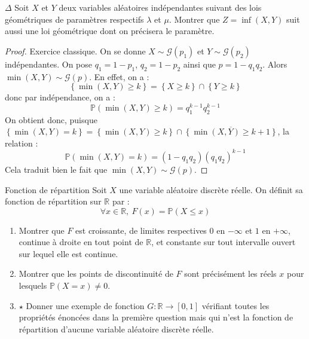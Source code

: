 \documentclass[french,a4paper]{article}
\renewcommand{\P}{\mathbb{P}}
\newcommand{\R}{\mathbb{R}}
\theoremstyle{plain}
\theoremstyle{definition}
\theoremstyle{remark}
\begin{document}
\begin{ex}{$\Delta$}
	Soit $X$ et $Y$ deux variables aléatoires indépendantes suivant des lois géométriques de paramètres respectifs $\lambda$ et $\mu$. Montrer que $Z=\inf(X,Y)$ suit aussi une loi géométrique dont on précisera le paramètre.
\end{ex}
\begin{proof}
	Exercice classique. On se donne $X\sim\mathcal{G}(p_1)$ et $Y\sim\mathcal{G}(p_2)$ indépendantes. On pose $q_1=1-p_1$, $q_2=1-p_2$ ainsi que $p=1-q_1q_2$. Alors $\min(X,Y)\sim\mathcal{G}(p)$. En effet, on a : $$\left\{\min(X,Y)\geqslant k\right\}=\left\{X\geqslant k\right\}\cap\left\{Y\geqslant k\right\}$$ donc par indépendance, on a : $$\P(\min(X,Y)\geqslant k)=q_1^{k-1}q_2^{k-1}$$ On obtient donc, puisque $\left\{\min(X,Y)=k\right\}=\left\{\min(X,Y)\geqslant k\right\}\cap\overline{\left\{\min(X,Y)\geqslant k+1\right\}}$, la relation : $$\P(\min(X,Y)=k)=(1-q_1q_2)(q_1q_2)^{k-1}$$ Cela traduit bien le fait que $\min(X,Y)\sim\mathcal{G}(p)$.
\end{proof}

\begin{ex}{Fonction de répartition}
	Soit $X$ une variable aléatoire discrète réelle. On définit sa fonction de répartition sur $\R$ par : $$\forall x\in\R,\ F(x)=\P(X\leqslant x)$$
	\begin{enumerate}
		\item Montrer que $F$ est croissante, de limites respectives $0$ en $-\infty$ et $1$ en $+\infty$, continue à droite en tout point de $\R$, et constante sur tout intervalle ouvert sur lequel elle est continue.
		\item Montrer que les points de discontinuité de $F$ sont précisément les réels $x$ pour lesquels $\P(X=x)\ne 0$.
		\item $\star$ Donner une exemple de fonction $G:\R\to[0,1]$ vérifiant toutes les propriétés énoncées dans la première question mais qui n'est la fonction de répartition d'aucune variable aléatoire discrète réelle.
	\end{enumerate}
\end{ex}
\end{document}
